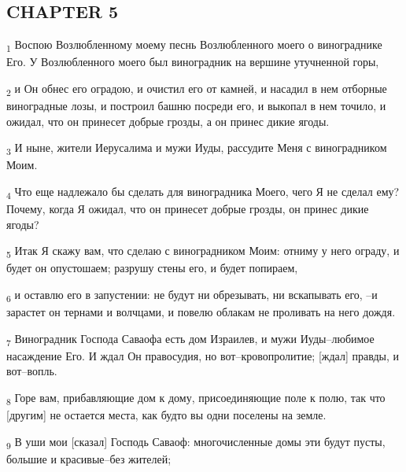 \subsection{CHAPTER 5}
\begin{tcolorbox}
\textsubscript{1} Воспою Возлюбленному моему песнь Возлюбленного моего о винограднике Его. У Возлюбленного моего был виноградник на вершине утучненной горы,
\end{tcolorbox}
\begin{tcolorbox}
\textsubscript{2} и Он обнес его оградою, и очистил его от камней, и насадил в нем отборные виноградные лозы, и построил башню посреди его, и выкопал в нем точило, и ожидал, что он принесет добрые грозды, а он принес дикие ягоды.
\end{tcolorbox}
\begin{tcolorbox}
\textsubscript{3} И ныне, жители Иерусалима и мужи Иуды, рассудите Меня с виноградником Моим.
\end{tcolorbox}
\begin{tcolorbox}
\textsubscript{4} Что еще надлежало бы сделать для виноградника Моего, чего Я не сделал ему? Почему, когда Я ожидал, что он принесет добрые грозды, он принес дикие ягоды?
\end{tcolorbox}
\begin{tcolorbox}
\textsubscript{5} Итак Я скажу вам, что сделаю с виноградником Моим: отниму у него ограду, и будет он опустошаем; разрушу стены его, и будет попираем,
\end{tcolorbox}
\begin{tcolorbox}
\textsubscript{6} и оставлю его в запустении: не будут ни обрезывать, ни вскапывать его, --и зарастет он тернами и волчцами, и повелю облакам не проливать на него дождя.
\end{tcolorbox}
\begin{tcolorbox}
\textsubscript{7} Виноградник Господа Саваофа есть дом Израилев, и мужи Иуды--любимое насаждение Его. И ждал Он правосудия, но вот--кровопролитие; [ждал] правды, и вот--вопль.
\end{tcolorbox}
\begin{tcolorbox}
\textsubscript{8} Горе вам, прибавляющие дом к дому, присоединяющие поле к полю, так что [другим] не остается места, как будто вы одни поселены на земле.
\end{tcolorbox}
\begin{tcolorbox}
\textsubscript{9} В уши мои [сказал] Господь Саваоф: многочисленные домы эти будут пусты, большие и красивые--без жителей;
\end{tcolorbox}

